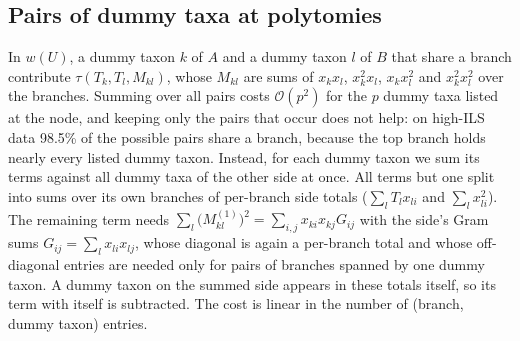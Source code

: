 \documentclass[11pt,a4paper]{article}
\newcommand{\Oh}{\mathcal{O}}
\begin{document}
\subsection{Pairs of dummy taxa at polytomies}\label{app:pairs}

In $w(U)$, a dummy taxon $k$ of $A$ and a dummy taxon $l$ of $B$ that share a branch contribute
$\tau(T_k,T_l,M_{kl})$, whose $M_{kl}$ are sums of $x_kx_l$, $x_k^2x_l$, $x_kx_l^2$ and $x_k^2x_l^2$
over the branches. Summing over all pairs costs $\Oh(p^2)$ for the $p$ dummy taxa listed at the node,
and keeping only the pairs that occur does not help: on high-ILS data 98.5\% of the possible pairs share
a branch, because the top branch holds nearly every listed dummy taxon. Instead, for each dummy taxon we
sum its terms against all dummy taxa of the other side at once. All terms but one split into sums over
its own branches of per-branch side totals ($\sum_l T_lx_{li}$ and $\sum_l x_{li}^2$). The remaining term
needs $\sum_l \bigl(M^{(1)}_{kl}\bigr)^2 = \sum_{i,j}x_{ki}x_{kj}G_{ij}$ with the side's Gram sums
$G_{ij}=\sum_l x_{li}x_{lj}$, whose diagonal is again a per-branch total and whose off-diagonal entries
are needed only for pairs of branches spanned by one dummy taxon. A dummy taxon on the summed side
appears in these totals itself, so its term with itself is subtracted. The cost is linear in the number
of (branch, dummy taxon) entries.
\end{document}

